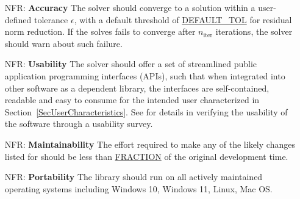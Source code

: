\documentclass[12pt]{article}
\newcounter{nfrnum} %
\begin{document}
\noindent \begin{itemize}

\item[NFR\refstepcounter{nfrnum}\thenfrnum \label{NFR:acc}:] \textbf{Accuracy} The solver
  should converge to a solution within a user-defined tolerance \(\epsilon\),
  with a default threshold of \hyperref[tab:const]{DEFAULT\_TOL} for residual
  norm reduction. If the solves fails to converge after \(n_\mathrm{iter}\)
  iterations, the solver should warn about such failure.


\item[NFR\refstepcounter{nfrnum}\thenfrnum \label{NFR:use}:] \textbf{Usability} The
  solver should offer a set of streamlined public application programming
  interfaces (APIs), such that when integrated into other software as a
  dependent library, the interfaces are self-contained, readable and easy to
  consume for the intended user characterized in
  Section~\ref{SecUserCharacteristics}. See \cite{VnVPlan} for details in
  verifying the usability of the software through a usability survey.


\item[NFR\refstepcounter{nfrnum}\thenfrnum \label{NFR:mt}:]
  \textbf{Maintainability} The effort required to make any of the likely changes
  listed for \progname{} should be less than \hyperref[tab:const]{FRACTION} of
  the original development time.

\item[NFR\refstepcounter{nfrnum}\thenfrnum \label{NFR:port}:] \textbf{Portability}
  The library should run on all actively maintained operating systems including
  Windows 10, Windows 11, Linux, Mac OS.


\end{itemize}
\end{document}
